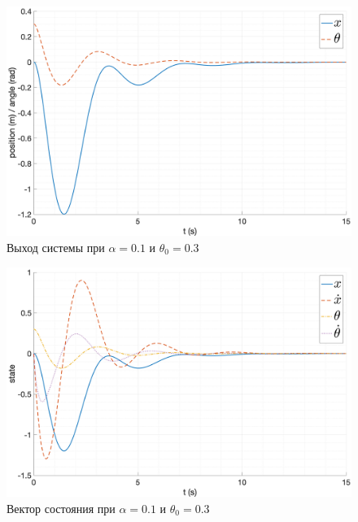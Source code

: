 \begin{figure}[ht!]
    \centering
    \includegraphics[width=\textwidth]{media/plots/nonmodal_controlers_min/out_2.png}
    \caption{Выход системы при $\alpha = 0.1$ и $\theta_0 = 0.3$}
    \label{fig:nonmodal_control_alpha_1_2}
\end{figure}
\begin{figure}[ht!]
    \centering
    \includegraphics[width=\textwidth]{media/plots/nonmodal_controlers_min/state_2.png}
    \caption{Вектор состояния при $\alpha = 0.1$ и $\theta_0 = 0.3$}
    \label{fig:nonmodal_control_alpha_1_2_state}
\end{figure}
